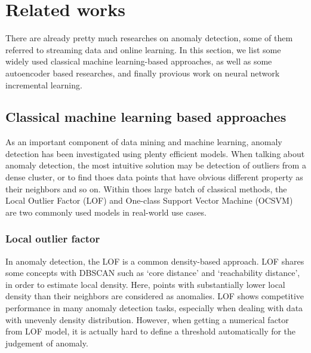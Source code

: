 \chapter{Related works}
\label{chap:related works}

There are already pretty much researches on anomaly detection, some of them referred to streaming data and online learning. In this section, we list some widely used classical machine learning-based approaches, as well as some autoencoder based researches, and finally provious work on neural network incremental learning.

\section{Classical machine learning based approaches}
\label{sec:Classical machine learning based approaches}

As an important component of data mining and machine learning, anomaly detection has been investigated using plenty efficient models. When talking about anomaly detection, the most intuitive solution may be detection of outliers from a dense cluster, or to find thoes data points that have obvious different property as their neighbors and so on. Within thoes large batch of classical methods, the Local Outlier Factor (LOF) and One-class Support Vector Machine (OCSVM) are two commonly used models in real-world use cases.

\subsection{Local outlier factor}
\label{lof}
In anomaly detection, the LOF is a common density-based approach. LOF shares some concepts with DBSCAN such as ‘core distance’ and ‘reachability distance’, in order to estimate local density. Here, points with substantially lower local density than their neighbors are considered as anomalies. LOF shows competitive performance in many anomaly detection tasks, especially when dealing with data with unevenly density distribution. However, when getting a numerical factor from LOF model, it is actually hard to define a threshold automatically for the judgement of anomaly.\\\\


